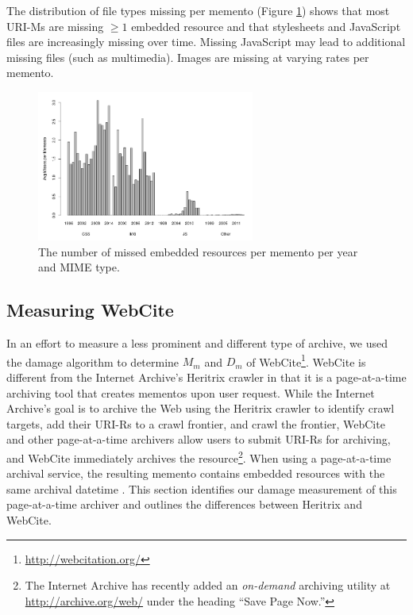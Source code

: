 The distribution of file types missing per memento (Figure \ref{occstats}) shows that most URI-Ms are missing $\ge 1$ embedded resource and that stylesheets and JavaScript files are increasingly missing over time. Missing JavaScript may lead to additional missing files (such as multimedia). Images are missing at varying rates per memento.

\begin{figure}[h!]
\includegraphics[width=270px]{./imgs/fileTypes.png}
\caption{The number of missed embedded resources per memento per year and MIME type.
}
\label{occstats}
\end{figure}



\subsection{Measuring WebCite}
\label{webcite}

In an effort to measure a less prominent and different type of archive, we used the damage algorithm to determine $M_m$ and $D_m$ of WebCite\footnote{\url{http://webcitation.org/}}\cite{webcite}. WebCite is different from the Internet Archive's Heritrix crawler in that it is a page-at-a-time archiving tool that creates mementos upon user request. While the Internet Archive's goal is to archive the Web using the Heritrix crawler to identify crawl targets, add their URI-Rs to a crawl frontier, and crawl the frontier, WebCite and other page-at-a-time archivers allow users to submit URI-Rs for archiving, and WebCite immediately archives the resource\footnote{The Internet Archive has recently added an \emph{on-demand} archiving utility at \url{http://archive.org/web/} under the heading ``Save Page Now.''}. When using a page-at-a-time archival service, the resulting memento contains embedded resources with the same archival datetime \cite{temporalCoherence}. This section identifies our damage measurement of this page-at-a-time archiver and outlines the differences between Heritrix and WebCite. 


